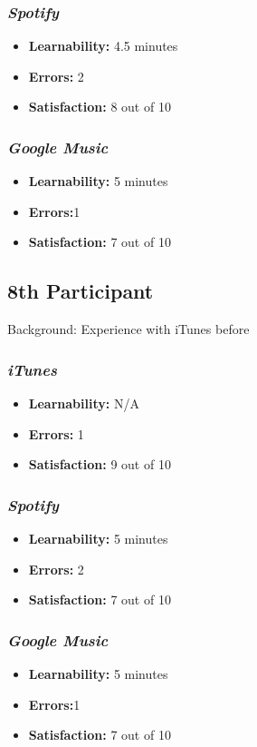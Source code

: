 \documentclass{article}
\begin{document}
\begin{multicols}{2}
\subsubsection{\it Spotify}
\begin{itemize}
	\item {\bf Learnability:} 4.5 minutes
	\item {\bf Errors:} 2
	\item {\bf Satisfaction:} 8 out of 10 
\end{itemize}

\subsubsection{\it Google Music}
\begin{itemize}
\item {\bf Learnability:} 5 minutes
	\item {\bf Errors:}1
	\item {\bf Satisfaction:} 7 out of 10 
\end{itemize} 

\subsection{8th Participant}
Background: Experience with iTunes before

\subsubsection{\it iTunes}
\begin{itemize}
	\item {\bf Learnability:} N/A
	\item {\bf Errors:} 1
	\item {\bf Satisfaction:} 9 out of 10 
\end{itemize}

\subsubsection{\it Spotify}
\begin{itemize}
	\item {\bf Learnability:} 5 minutes
	\item {\bf Errors:} 2
	\item {\bf Satisfaction:} 7 out of 10 
\end{itemize}

\subsubsection{\it Google Music}
\begin{itemize}
\item {\bf Learnability:} 5 minutes
	\item {\bf Errors:}1
	\item {\bf Satisfaction:} 7 out of 10 
\end{itemize} 
\end{multicols}
\end{document}
